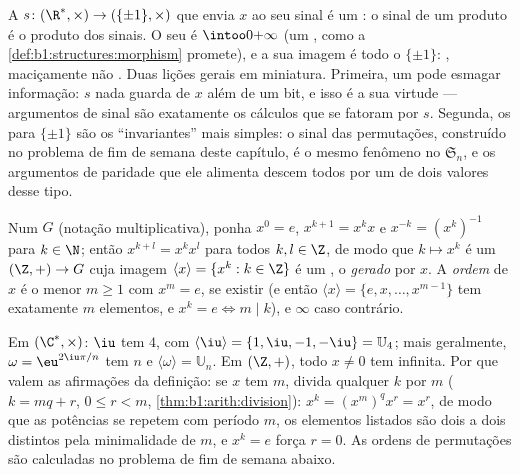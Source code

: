 \begin{example}\label{ex:b1:structures:signmorphism}
A  $s \colon (\R^*, \times) \to (\{\pm1\}, \times)$ que envia
$x$ ao seu sinal é um : o sinal de um produto é o
produto dos sinais. O seu  é $\intoo0{+\infty}$ (um
, como a \cref{def:b1:structures:morphism} promete), e a sua
imagem é todo o $\{\pm1\}$: , maciçamente não .
Duas lições gerais em miniatura. Primeira, um  pode esmagar
informação: $s$ nada guarda de $x$ além de um bit, e isso
é a sua virtude --- argumentos de sinal são exatamente os cálculos
que se fatoram por $s$. Segunda, os  para $\{\pm1\}$ são os
``invariantes'' mais simples: o sinal das permutações, construído no
problema de fim de semana deste capítulo, é o mesmo fenômeno no
 $\mathfrak S_n$, e os argumentos de paridade que ele alimenta
descem todos por um  de dois valores desse tipo.
\end{example}

\begin{definition}\label{def:b1:structures:order}
Num  $G$ (notação multiplicativa), ponha $x^0 = e$, $x^{k+1} =
x^k x$ e $x^{-k} = (x^k)^{-1}$ para $k \in \N$; então $x^{k+l} = x^k
x^l$ para todos $k, l \in \Z$, de modo que $k \mapsto x^k$ é um  $(\Z,
+) \to G$ cuja imagem $\langle x \rangle = \{x^k : k \in \Z\}$ é um
, o  \emph{gerado} por $x$. A
\emph{ordem} de $x$ é o menor $m \geq
1$ com $x^m = e$, se existir (e então $\langle x\rangle = \{e, x,
\dots, x^{m-1}\}$ tem exatamente $m$ elementos, e $x^k = e \iff m
\mid k$), e $\infty$ caso contrário.
\end{definition}

\begin{example}\label{ex:b1:structures:order}
Em $(\C^*, \times)$: $\iu$ tem  $4$, com $\langle \iu \rangle
= \{1, \iu, -1, -\iu\} = \mathbb{U}_4$; mais geralmente, $\omega =
\eu^{2\iu\pi/n}$ tem  $n$ e $\langle\omega\rangle =
\mathbb{U}_n$. Em $(\Z, +)$, todo $x \neq 0$ tem  infinita.
Por que valem as afirmações da definição: se $x$ tem  $m$, divida
qualquer $k$ por $m$ ($k = mq + r$, $0 \leq r < m$,
\cref{thm:b1:arith:division}): $x^k = (x^m)^q x^r = x^r$, de modo que as
potências se repetem com período $m$, os elementos listados são dois a
dois distintos pela minimalidade de $m$, e $x^k = e$ força $r = 0$. As
ordens de permutações são calculadas no problema de fim de semana abaixo.
\end{example}

